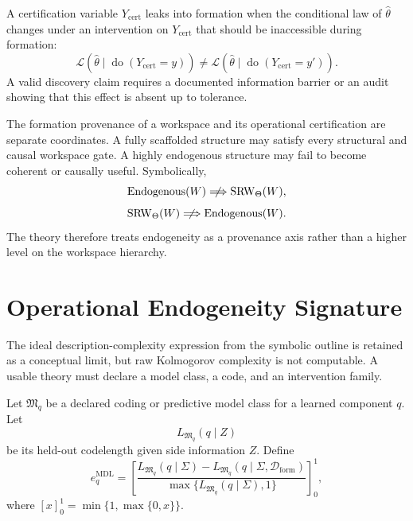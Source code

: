 \begin{SRWTdefinition}\label{SRWT:def:formation-leakage}
A certification variable \(Y_{\mathrm{cert}}\) leaks into formation when the
conditional law of \(\widehat\theta\) changes under an intervention on
\(Y_{\mathrm{cert}}\) that should be inaccessible during formation:
\[
\mathcal L
\left(
\widehat\theta
\mid
\operatorname{do}(Y_{\mathrm{cert}}=y)
\right)
\neq
\mathcal L
\left(
\widehat\theta
\mid
\operatorname{do}(Y_{\mathrm{cert}}=y')
\right).
\]
A valid discovery claim requires a documented information barrier or an audit
showing that this effect is absent up to tolerance.
\end{SRWTdefinition}


The formation provenance of a workspace and its operational certification are
separate coordinates. A fully scaffolded structure may satisfy every
structural and causal workspace gate. A highly endogenous structure may fail
to become coherent or causally useful. Symbolically,
\[
\operatorname{Endogenous}(W)
\centernot\Longrightarrow
\operatorname{SRW}_{\Theta}(W),
\]
\[
\operatorname{SRW}_{\Theta}(W)
\centernot\Longrightarrow
\operatorname{Endogenous}(W).
\]
The theory therefore treats endogeneity as a provenance axis rather than a
higher level on the workspace hierarchy.

\section{Operational Endogeneity Signature}

The ideal description-complexity expression from the symbolic outline is
retained as a conceptual limit, but raw Kolmogorov complexity is not
computable. A usable theory must declare a model class, a code, and an
intervention family.

\begin{SRWTdefinition}\label{SRWT:def:mdl-endogeneity}
Let \(\mathfrak M_q\) be a declared coding or predictive model class for a
learned component \(q\). Let
\[
L_{\mathfrak M_q}(q\mid Z)
\]
be its held-out codelength given side information \(Z\). Define
\[
\boxed{
 e_q^{\mathrm{MDL}}
 =
 \left[
 \frac{
 L_{\mathfrak M_q}(q\mid\Sigma)
 -
 L_{\mathfrak M_q}(q\mid\Sigma,\mathcal D_{\mathrm{form}})
 }{
 \max\{L_{\mathfrak M_q}(q\mid\Sigma),1\}
 }
 \right]_{0}^{1},
}
\]
where \([x]_0^1=\min\{1,\max\{0,x\}\}\).
\end{SRWTdefinition}

